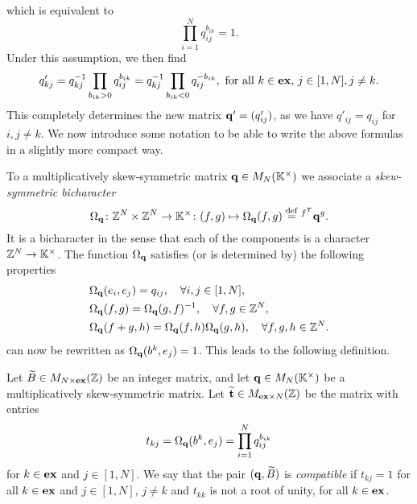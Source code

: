 which is equivalent to
\begin{equation}\label{eq:compatibility_q_b}
	\prod_{i=1}^N q_{ij}^{b_{ik}} = 1.
\end{equation}
%
Under this assumption, we then find
\begin{equation}\label{eq:mutated_q_kj}
	q'_{kj} = q_{kj}^{-1} \prod_{b_{ik} > 0}q_{ij}^{b_{ik}} = q_{kj}^{-1} \prod_{b_{ik} < 0}q_{ij}^{-b_{ik}}, \text{ for all } k \in \mathbf{ex},\, j\in [1, N], j\neq k.
\end{equation}
%
This completely determines the new matrix $\mathbf{q}' = (q'_{ij})$, as we have $q'_{ij} =
	q_{ij}$ for $i,j \neq k$. We now introduce some notation to be able to write the above
formulas in a slightly more compact way.

To a multiplicatively skew-symmetric matrix $\mathbf{q} \in M_N(\mathbb{K}^\times)$ we associate a
\emph{skew-symmetric bicharacter}
\begin{equation*}
	\Omega_{\mathbf{q}} \colon \mathbb{Z}^N \times \mathbb{Z}^N \to \mathbb{K}^\times \colon
	(f,g) \mapsto \Omega_{\mathbf{q}}(f, g) \overset{\mathrm{def}}{=} \prescript{f^T}{}{}\mathbf{q}^g.
\end{equation*}
%
%
It is a bicharacter in the sense that each of the components is a character $\mathbb{Z}^N \to
	\mathbb{K}^\times$. The function $\Omega_{\mathbf{q}}$ satisfies (or is determined by) the following
properties
\begin{align}
	 & \Omega_{\mathbf{q}} (e_i, e_j) = q_{ij}, \quad \forall i, j \in [1, N],\label{eq:Omega_of_basis}                             \\
	 & \Omega_{\mathbf{q}} (f, g) = \Omega_{\mathbf{q}} (g, f)^{-1},\quad \forall f, g \in \mathbb{Z}^N,\label{eq:Omega_skew_symmetric}            \\
	 & \Omega_{\mathbf{q}} (f + g, h) = \Omega_{\mathbf{q}}(f, h)\Omega_{\mathbf{q}}(g, h), \quad \forall f, g, h\in \mathbb{Z}^N.\label{eq:Omega_of_sum}
\end{align}
%
 can now be rewritten as $\Omega_{\mathbf{q}}(b^k, e_j) = 1$. This leads to the following definition.
\begin{definition}\label{def:compatible_pair}

	Let $\widetilde{B} \in M_{N \times \mathbf{ex}}(\mathbb{Z})$ be an integer matrix, and let $\mathbf{q} \in
		M_N(\mathbb{K}^\times)$ be a multiplicatively skew-symmetric matrix. Let $\widetilde{\mathbf{t}}\in M_{\mathbf{ex}
				\times N}(\mathbb{Z})$ be the matrix with entries
	\begin{equation*}
		t_{kj} = \Omega_{\mathbf{q}}(b^k, e_j) = \prod_{i=1}^N q_{ij}^{b_{ik}}
	\end{equation*}
	for $k \in \mathbf{ex}$ and $j \in [1, N]$. We say that the pair $(\mathbf{q}, \widetilde{B})$ is \emph{compatible} if $t_{kj} = 1$ for all $k \in \mathbf{ex}$ and $j \in [1, N],\, j\neq k$ and  $t_{kk}$ is not a root of unity, for all $k\in \mathbf{ex}$.
\end{definition}
